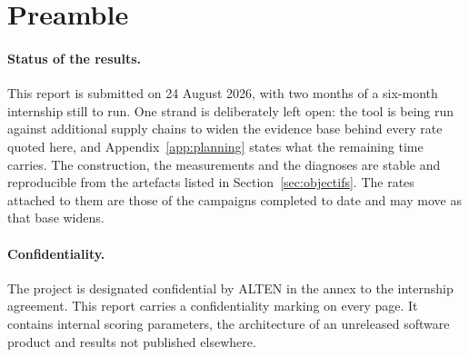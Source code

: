 \section*{Preamble}
\label{sec:preambule}

\paragraph{Status of the results.}
This report is submitted on 24 August 2026, with two months of a six-month internship still to
run. One strand is deliberately left open: the tool is being run against additional
supply chains to widen the evidence base behind every rate quoted here, and
Appendix~\ref{app:planning} states what the remaining time carries. The construction, the
measurements and the diagnoses are stable and reproducible from the artefacts listed in
Section~\ref{sec:objectifs}. The rates attached to them are those of the campaigns completed
to date and may move as that base widens.

\paragraph{Confidentiality.}
The project is designated confidential by ALTEN in the annex to the internship agreement.
This report carries a confidentiality marking on every page. It contains internal scoring
parameters, the architecture of an unreleased software product and results not published
elsewhere.
